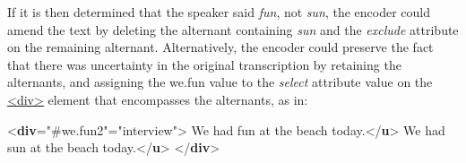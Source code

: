 If it is then determined that the speaker said \textit{fun}, not \textit{sun}, the encoder could amend the text by deleting the alternant containing \textit{sun} and the {\itshape exclude} attribute on the remaining alternant. Alternatively, the encoder could preserve the fact that there was uncertainty in the original transcription by retaining the alternants, and assigning the we.fun value to the {\itshape select} attribute value on the \hyperref[TEI.div]{<div>} element that encompasses the alternants, as in: \par\bgroup{}\exampleFont \begin{shaded}\noindent\mbox{}{<\textbf{div}\hspace*{1em}{select}="{\#we.fun2}"\hspace*{1em}{type}="{interview}">}\mbox{}\newline 
{}We had fun at the beach\mbox{}\newline 
\hspace*{1em}\hspace*{1em} today.{</\textbf{u}>}\mbox{}\newline 
{}We had sun at the beach today.{</\textbf{u}>}\mbox{}\newline 
{</\textbf{div}>}\end{shaded}\egroup\par \par
